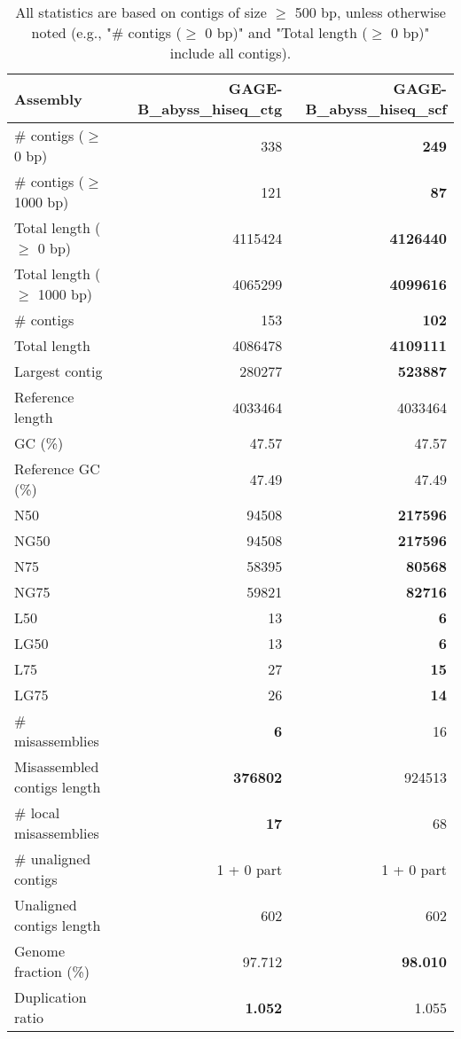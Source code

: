 \documentclass[12pt,a4paper]{article}
\begin{document}
\begin{table}[ht]
\begin{center}
\caption{All statistics are based on contigs of size $\geq$ 500 bp, unless otherwise noted (e.g., "\# contigs ($\geq$ 0 bp)" and "Total length ($\geq$ 0 bp)" include all contigs).}
\begin{tabular}{|l*{2}{|r}|}
\hline
Assembly & GAGE-B\_abyss\_hiseq\_ctg & GAGE-B\_abyss\_hiseq\_scf \\ \hline
\# contigs ($\geq$ 0 bp) & 338 & {\bf 249} \\ \hline
\# contigs ($\geq$ 1000 bp) & 121 & {\bf 87} \\ \hline
Total length ($\geq$ 0 bp) & 4115424 & {\bf 4126440} \\ \hline
Total length ($\geq$ 1000 bp) & 4065299 & {\bf 4099616} \\ \hline
\# contigs & 153 & {\bf 102} \\ \hline
Total length & 4086478 & {\bf 4109111} \\ \hline
Largest contig & 280277 & {\bf 523887} \\ \hline
Reference length & 4033464 & 4033464 \\ \hline
GC (\%) & 47.57 & 47.57 \\ \hline
Reference GC (\%) & 47.49 & 47.49 \\ \hline
N50 & 94508 & {\bf 217596} \\ \hline
NG50 & 94508 & {\bf 217596} \\ \hline
N75 & 58395 & {\bf 80568} \\ \hline
NG75 & 59821 & {\bf 82716} \\ \hline
L50 & 13 & {\bf 6} \\ \hline
LG50 & 13 & {\bf 6} \\ \hline
L75 & 27 & {\bf 15} \\ \hline
LG75 & 26 & {\bf 14} \\ \hline
\# misassemblies & {\bf 6} & 16 \\ \hline
Misassembled contigs length & {\bf 376802} & 924513 \\ \hline
\# local misassemblies & {\bf 17} & 68 \\ \hline
\# unaligned contigs & 1 + 0 part & 1 + 0 part \\ \hline
Unaligned contigs length & 602 & 602 \\ \hline
Genome fraction (\%) & 97.712 & {\bf 98.010} \\ \hline
Duplication ratio & {\bf 1.052} & 1.055 \\ \hline

\end{tabular}
\end{center}
\end{table}
\end{document}
